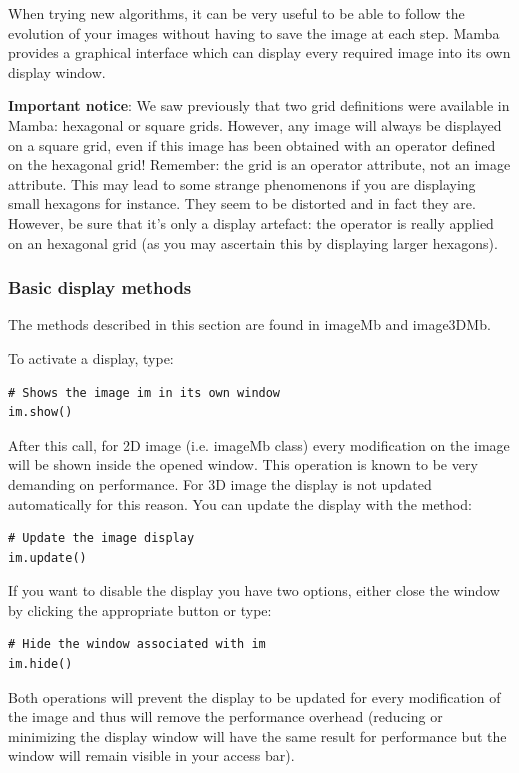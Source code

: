 \documentclass[a4paper,10pt,oneside]{article}
\begin{document}
When trying new algorithms, it can be very useful to be able to follow the 
evolution of your images without having to save the image at each step. Mamba
provides a graphical interface which can display every required image into
its own display window.

\textbf{Important notice}: We saw previously that two grid definitions were 
available in Mamba: hexagonal or square grids. However, any image will always be 
displayed on a square grid, even if this image has been obtained with an operator 
defined on the hexagonal grid! Remember: the grid is an operator attribute, not an 
image attribute. This may lead to some strange phenomenons if you are displaying 
small hexagons for instance. They seem to be distorted and in fact they are. However, 
be sure that it's only a display artefact: the operator is really applied on an hexagonal 
grid (as you may ascertain this by displaying larger hexagons).

\subsubsection{Basic display methods}

The methods described in this section are found in imageMb and image3DMb.

To activate a display, type:

\lstset{language=Python}
\begin{lstlisting}
# Shows the image im in its own window
im.show()
\end{lstlisting}

After this call, for 2D image (i.e. imageMb class) every modification on the
image will be shown inside the opened window. This operation is known to be
very demanding on performance. For 3D image the display is not updated
automatically for this reason. You can update the display with the method:

\lstset{language=Python}
\begin{lstlisting}
# Update the image display
im.update()
\end{lstlisting}

If you want to disable the display you have two options, either close the window
by clicking the appropriate button or type:

\lstset{language=Python}
\begin{lstlisting}
# Hide the window associated with im
im.hide()
\end{lstlisting}

Both operations will prevent the display to be updated for every modification of
the image and thus will remove the performance overhead (reducing or minimizing 
the display window will have the same result for performance but the window will
remain visible in your access bar).
\end{document}
